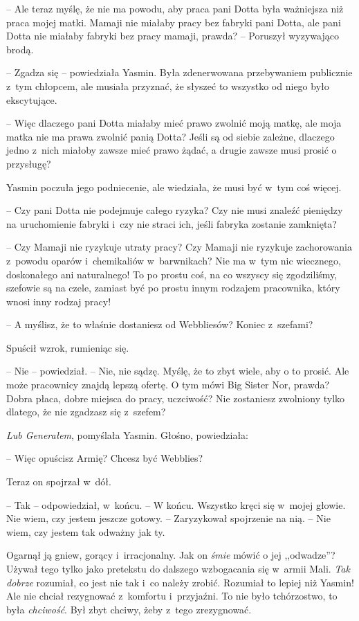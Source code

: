 \documentclass[oneside,polish,11pt,rmheadings]{mwbk}
\begin{document}
-- Ale teraz myślę, że nie ma powodu, aby praca pani Dotta była ważniejsza niż praca mojej matki. Mamaji nie miałaby pracy bez fabryki pani Dotta, ale pani Dotta nie miałaby fabryki bez pracy mamaji, prawda? -- Poruszył wyzywająco brodą.

-- Zgadza się -- powiedziała Yasmin. Była zdenerwowana przebywaniem publicznie z~tym chłopcem, ale musiała przyznać, że słyszeć to wszystko od niego było ekscytujące.

-- Więc dlaczego pani Dotta miałaby mieć prawo zwolnić moją matkę, ale moja matka nie ma prawa zwolnić panią Dotta? Jeśli są od siebie zależne, dlaczego jedno z~nich miałoby zawsze mieć prawo żądać, a drugie zawsze musi prosić o przysługę?

Yasmin poczuła jego podniecenie, ale wiedziała, że musi być w~tym coś więcej. 

-- Czy pani Dotta nie podejmuje całego ryzyka? Czy nie musi znaleźć pieniędzy na uruchomienie fabryki i~czy nie straci ich, jeśli fabryka zostanie zamknięta?

-- Czy Mamaji nie ryzykuje utraty pracy? Czy Mamaji nie ryzykuje zachorowania z~powodu oparów i~chemikaliów w~barwnikach? Nie ma w~tym nic wiecznego, doskonałego ani naturalnego! To po prostu coś, na co wszyscy się zgodziliśmy, szefowie są na czele, zamiast być po prostu innym rodzajem pracownika, który wnosi inny rodzaj pracy!

-- A myślisz, że to właśnie dostaniesz od Webbliesów? Koniec z~szefami?

Spuścił wzrok, rumieniąc się. 

-- Nie -- powiedział. -- Nie, nie sądzę. Myślę, że to zbyt wiele, aby o to prosić. Ale może pracownicy znajdą lepszą ofertę. O tym mówi Big Sister Nor, prawda? Dobra płaca, dobre miejsca do pracy, uczciwość? Nie zostaniesz zwolniony tylko dlatego, że nie zgadzasz się z~szefem?

\textit{Lub Generałem}, pomyślała Yasmin. Głośno, powiedziała: 

-- Więc opuścisz Armię? Chcesz być Webblies?

Teraz on spojrzał w~dół. 

-- Tak -- odpowiedział, w~końcu. -- W końcu. Wszystko kręci się w~mojej głowie. Nie wiem, czy jestem jeszcze gotowy. -- Zaryzykował spojrzenie na nią. -- Nie wiem, czy jestem tak odważny jak ty.

Ogarnął ją gniew, gorący i~irracjonalny. Jak on \textit{śmie }mówić o jej ,,odwadze''? Używał tego tylko jako pretekstu do dalszego wzbogacania się w~armii Mali. \textit{Tak dobrze }rozumiał, co jest nie tak i~co należy zrobić. Rozumiał to lepiej niż Yasmin! Ale nie chciał rezygnować z~komfortu i~przyjaźni. To nie było tchórzostwo, to była \textit{chciwość}. Był zbyt chciwy, żeby z~tego zrezygnować.
\end{document}
